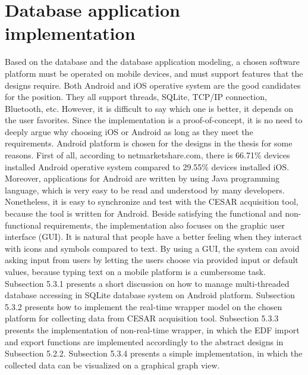 \section{Database application implementation}
Based on the database and the database application modeling, a chosen software platform must be operated on mobile devices, and must support features that the designs require. Both Android and iOS operative system are the good candidates for the position. They all support threads, SQLite, TCP/IP connection, Bluetooth, etc. However, it is difficult to say which one is better, it depends on the user favorites. Since the implementation is a proof-of-concept, it is no need to deeply argue why choosing iOS or Android as long as they meet the requirements. Android platform is chosen for the designs in the thesis for some reasons. First of all, according to netmarketshare.com\citep{NETMARKETSHARE}, there is 66.71\% devices installed Android operative system compared to 29.55\% devices installed iOS. Moreover, applications for Android are written by using Java programming language, which is very easy to be read and understood by many developers. Nonetheless, it is easy to synchronize and test with the CESAR acquisition tool, because the tool is written for Android.
Beside satisfying the functional and non-functional requirements, the implementation also focuses on the graphic user interface (GUI). It is natural that people have a better feeling when they interact with icons and symbols compared to text. By using a GUI, the system can avoid asking input from users by letting the users choose via provided input or default values, because typing text on a mobile platform is a cumbersome task.\\
Subsection 5.3.1 presents a short discussion on how to manage multi-threaded database accessing in SQLite database system on Android platform. Subsection 5.3.2 presents how to implement the real-time wrapper model on the chosen platform for collecting data from CESAR acquisition tool. Subsection 5.3.3 presents the implementation of non-real-time wrapper, in which the EDF import and export functions are implemented accordingly to the abstract designs in Subsection 5.2.2. Subsection 5.3.4 presents a simple implementation, in which the collected data can be visualized on a graphical graph view.
